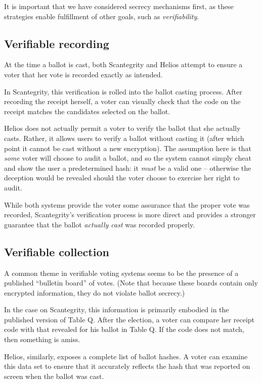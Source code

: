 \documentclass[10pt,twocolumn]{article}
\begin{document}
It is important that we have considered secrecy mechanisms first, as these strategies enable
fulfillment of other goals, such as \emph{verifiability}.

\subsection{Verifiable recording}

At the time a ballot is cast, both Scantegrity and Helios attempt to ensure a voter that her
vote is recorded exactly as intended.

In Scantegrity, this verification is rolled into the ballot casting process. After recording the
receipt herself, a voter can visually check that the code on the receipt matches the candidates
selected on the ballot.

Helios does not actually permit a voter to verify the ballot that she actually casts. Rather, it
allows users to verify a ballot without casting it (after which point it cannot be cast without
a new encryption). The assumption here is that \emph{some} voter will choose to audit a ballot, and
so the system cannot simply cheat and show the user a predetermined hash: it \emph{must} be a valid
one -- otherwise the deception would be revealed should the voter choose to exercise her right
to audit.

While both systems provide the voter some assurance that the proper vote was recorded, Scantegrity's
verification process is more direct and provides a stronger guarantee that the ballot \emph{actually
cast} was recorded properly.

\subsection{Verifiable collection}

A common theme in verifiable voting systems seems to be the presence of a published ``bulletin
board'' of votes. (Note that because these boards contain only encrypted information, they do not
violate ballot secrecy.)

In the case on Scantegrity, this information is primarily embodied in the published version of Table
Q. After the election, a voter can compare her receipt code with that revealed for his ballot in
Table Q. If the code does not match, then something is amiss.

Helios, similarly, exposes a complete list of ballot hashes. A voter can examine this data set to
ensure that it accurately reflects the hash that was reported on screen when the ballot was cast.
\end{document}
